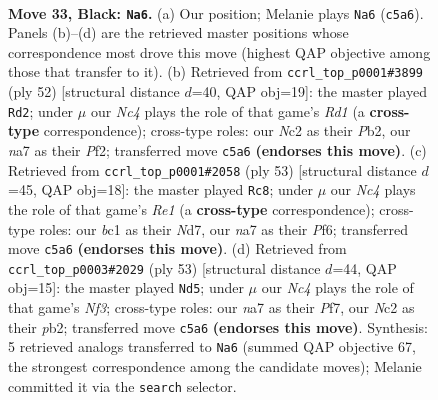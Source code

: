 \documentclass[11pt]{article}
\begin{document}
\clearpage

\begin{figure}[p]\centering
\begin{subfigure}{0.46\textwidth}\centering
\resizebox{\linewidth}{!}{%
\newchessgame
\chessboard[
  setfen={5r2/Nppkp2p/6p1/p1n5/5P1P/2P5/P1n2PK1/2B4R b - - 12 33},
  showmover=false,
  pgfstyle=straightmove, color=movearrow, markmove={c5-a6}
]}
\caption{}
\end{subfigure}\hfill
\begin{subfigure}{0.46\textwidth}\centering
\resizebox{\linewidth}{!}{%
\newchessgame
\chessboard[
  setfen={2r5/1bp3pp/p3kp2/7P/Pp6/1P2N3/1P3PP1/3R2K1 w - - 5 27},
  showmover=false,
  pgfstyle=straightmove, color=movearrow, markmove={d1-d2}
]}
\caption{}
\end{subfigure}
\\[4pt]
\begin{subfigure}{0.46\textwidth}\centering
\resizebox{\linewidth}{!}{%
\newchessgame
\chessboard[
  setfen={4r1k1/3n1p2/p2Ppp1p/8/PpP5/4B2P/5PP1/3R2K1 b - - 0 27},
  showmover=false,
  pgfstyle=straightmove, color=movearrow, markmove={e8-c8}
]}
\caption{}
\end{subfigure}\hfill
\begin{subfigure}{0.46\textwidth}\centering
\resizebox{\linewidth}{!}{%
\newchessgame
\chessboard[
  setfen={2r3k1/5pp1/p3pn1p/1pP4P/8/5P2/PP3BP1/1K5R b - - 2 27},
  showmover=false,
  pgfstyle=straightmove, color=movearrow, markmove={f6-d5}
]}
\caption{}
\end{subfigure}
\caption{\textbf{Move 33, Black: \texttt{Na6}.} (a) Our position; Melanie plays \texttt{Na6} (\texttt{c5a6}). Panels (b)--(d) are the retrieved master positions whose correspondence most drove this move (highest QAP objective among those that transfer to it). (b) Retrieved from \texttt{ccrl\_top\_p0001\#3899} (ply 52) [structural distance $d$=40, QAP obj=19]: the master played \texttt{Rd2}; under $\mu$ our \emph{Nc4} plays the role of that game's \emph{Rd1} (a \textbf{cross-type} correspondence); cross-type roles: our \emph{N}c2 as their \emph{P}b2, our \emph{n}a7 as their \emph{P}f2; transferred move \texttt{c5a6} \textbf{(endorses this move)}. (c) Retrieved from \texttt{ccrl\_top\_p0001\#2058} (ply 53) [structural distance $d$=45, QAP obj=18]: the master played \texttt{Rc8}; under $\mu$ our \emph{Nc4} plays the role of that game's \emph{Re1} (a \textbf{cross-type} correspondence); cross-type roles: our \emph{b}c1 as their \emph{N}d7, our \emph{n}a7 as their \emph{P}f6; transferred move \texttt{c5a6} \textbf{(endorses this move)}. (d) Retrieved from \texttt{ccrl\_top\_p0003\#2029} (ply 53) [structural distance $d$=44, QAP obj=15]: the master played \texttt{Nd5}; under $\mu$ our \emph{Nc4} plays the role of that game's \emph{Nf3}; cross-type roles: our \emph{n}a7 as their \emph{P}f7, our \emph{N}c2 as their \emph{p}b2; transferred move \texttt{c5a6} \textbf{(endorses this move)}. Synthesis: 5 retrieved analogs transferred to \texttt{Na6} (summed QAP objective 67, the strongest correspondence among the candidate moves); Melanie committed it via the \texttt{search} selector.}
\label{fig:thought-m65}
\end{figure}
\end{document}
